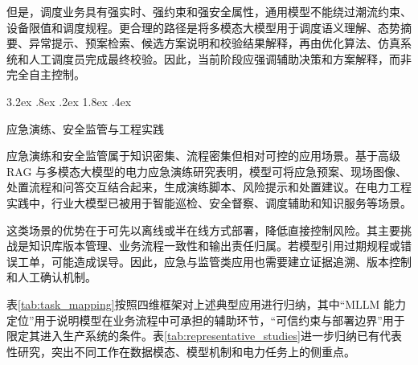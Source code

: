 \documentclass[10.5pt,compsoc]{CjC}
\makeatletter
\renewcommand\subsection{\@startsection{subsection}{2}{\z@}%
  {3.2ex \@plus .8ex \@minus .2ex}%
  {1.8ex \@plus .4ex}%
  {\normalfont\zihao{5}\heiti\bfseries\raggedright}}
\theoremstyle{mystyle}
\makeatother
\begin{document}
但是，调度业务具有强实时、强约束和强安全属性，通用模型不能绕过潮流约束、设备限值和调度规程。更合理的路径是将多模态大模型用于调度语义理解、态势摘要、异常提示、预案检索、候选方案说明和校验结果解释，再由优化算法、仿真系统和人工调度员完成最终校验。因此，当前阶段应强调辅助决策和方案解释，而非完全自主控制。


\subsection{应急演练、安全监管与工程实践}

应急演练和安全监管属于知识密集、流程密集但相对可控的应用场景。基于高级 RAG 与多模态大模型的电力应急演练研究表明，模型可将应急预案、现场图像、处置流程和问答交互结合起来，生成演练脚本、风险提示和处置建议\cite{liwenchao2025rag}。在电力工程实践中，行业大模型已被用于智能巡检、安全督察、调度辅助和知识服务等场景\cite{ghafari2025comprehensive,li2024foundation_power}。

这类场景的优势在于可先以离线或半在线方式部署，降低直接控制风险。其主要挑战是知识库版本管理、业务流程一致性和输出责任归属。若模型引用过期规程或错误工单，可能造成误导。因此，应急与监管类应用也需要建立证据追溯、版本控制和人工确认机制。

表\ref{tab:task_mapping}按照四维框架对上述典型应用进行归纳，其中``MLLM 能力定位''用于说明模型在业务流程中可承担的辅助环节，``可信约束与部署边界''用于限定其进入生产系统的条件。表\ref{tab:representative_studies}进一步归纳已有代表性研究，突出不同工作在数据模态、模型机制和电力任务上的侧重点。
\end{document}
